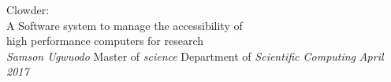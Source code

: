 \documentclass[dvips,letterpaper,12pt]{report}
\begin{document}

\thesistitle
	{Clowder: \\
	 A Software system to manage the accessibility of \\
high performance computers for research \\
	 \footnotesize}
	{\emph{Samson Ugwuodo}}
	{Master of \emph{science}}
	{Department of \emph{Scientific Computing}}		
	{\emph{April 2017}}
















\appendix

\end{document}
